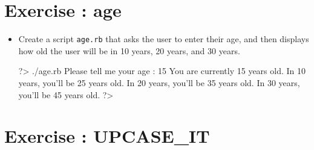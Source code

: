 \documentclass{42-en}
\begin{document}


\chapter{Exercise \exercicenumber: age}

\exnumber{\exercicenumber}

\makeheaderfiles

\begin{itemize}

\item Create a script \texttt{age.rb} that asks the user to enter their age, and then displays how old the user will be in 10 years, 20 years, and 30 years.

\begin{42console}
	?> ./age.rb
	Please tell me your age : 15
	You are currently 15 years old.
	In 10 years, you'll be 25 years old.
	In 20 years, you'll be 35 years old.
	In 30 years, you'll be 45 years old.
	?>
\end{42console}

\end{itemize}




\chapter{Exercise \exercicenumber: UPCASE\_IT}

\exnumber{\exercicenumber}
\end{document}
